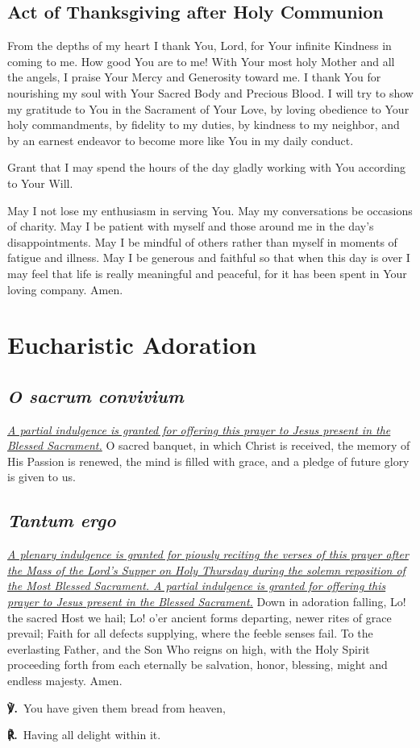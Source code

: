 \documentclass[12pt]{article}
\makeatletter
\newcommand{\prayersection}[1]{\section{#1}}
\newcommand{\prayertitle}[1]{\subsection{#1}}
\newcommand{\indulgencedprayertitle}[1]{\prayertitle{#1 \protect\kreuz}}
\newcommand{\emphasis}[1]{\emph{#1}}
\newcommand{\emphasis}[1]{\textsl{#1}}
\newcommand{\foreign}[1]{\emphasis{#1}}
\newcommand{\note}[1]{{\small{\emphasis{#1}}}\newline}
\newcommand{\linkednote}[2]{\hyperlink{#1}{\note{#2}}}
\newcommand{\versicle}{{\setmainfont{Times New Roman}\textbf{℣.}}\xspace}
\newcommand{\response}{{\setmainfont{Times New Roman}\textbf{℟.}}\xspace}
\DeclareRobustCommand{\versicle}{\textbf{\vers@resp{-0.1em}{V}.}\xspace}
\DeclareRobustCommand{\response}{\textbf{\vers@resp{0pt}{R}.}\xspace}
\newcommand{\vers@resp@sym}{\raisebox{0.2ex}{\rotatebox[origin=c]{-20}{$\m@th\rceil$}}}
\newcommand{\vers@resp}[2]{%
		{\ooalign{\hidewidth\kern#1\vers@resp@sym\hidewidth\cr#2\cr}}%
	}
\makeatother
\begin{document}
\prayertitle{Act of Thanksgiving after Holy Communion}
From the depths of my heart I thank You, Lord, for Your infinite Kindness in coming to me.
How good You are to me!
With Your most holy Mother and all the angels, I praise Your Mercy and Generosity toward me.
I thank You for nourishing my soul with Your Sacred Body and Precious Blood.
I will try to show my gratitude to You in the Sacrament of Your Love, by loving obedience to Your holy commandments, by fidelity to my duties, by kindness to my neighbor, and by an earnest endeavor to become more like You in my daily conduct.

Grant that I may spend the hours of the day gladly working with You according to Your Will.

May I not lose my enthusiasm in serving You.
May my conversations be occasions of charity.
May I be patient with myself and those around me in the day's disappointments.
May I be mindful of others rather than myself in moments of fatigue and illness.
May I be generous and faithful so that when this day is over I may feel that life is really meaningful and peaceful, for it has been spent in Your loving company.
Amen.

\newpage

\prayersection{Eucharistic Adoration}
\indulgencedprayertitle{\foreign{O sacrum convivium}}
\linkednote{grant7}{A partial indulgence is granted for offering this prayer to Jesus present in the Blessed Sacrament.}
O sacred banquet, in which Christ is received, the memory of His Passion is renewed, the mind is filled with grace, and a pledge of future glory is given to us.

\indulgencedprayertitle{\foreign{Tantum ergo}}
\linkednote{grant7}{A plenary indulgence is granted for piously reciting the verses of this prayer after the Mass of the Lord's Supper on Holy Thursday during the solemn reposition of the Most Blessed Sacrament.
A partial indulgence is granted for offering this prayer to Jesus present in the Blessed Sacrament.}
Down in adoration falling,
Lo! the sacred Host we hail;
Lo! o'er ancient forms departing,
newer rites of grace prevail;
Faith for all defects supplying,
where the feeble senses fail.
To the everlasting Father,
and the Son Who reigns on high,
with the Holy Spirit proceeding
forth from each eternally
be salvation, honor, blessing,
might and endless majesty.
Amen.

\versicle\ You have given them bread from heaven,

\response\ Having all delight within it.
\end{document}
